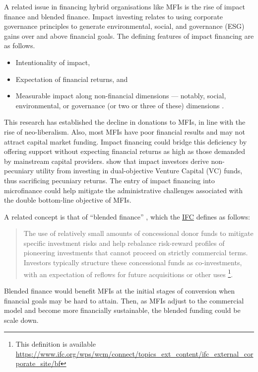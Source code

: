 \documentclass[a4paper, nobind]{templates/ociamthesis}
\begin{document}
A related issue in financing hybrid organisations like MFIs is the rise of impact finance and blended finance. Impact investing relates to using corporate governance principles to generate environmental, social, and governance (ESG) gains over and above financial goals. The defining features of impact financing are as follows.

\begin{itemize}
\item
  Intentionality of impact,
\item
  Expectation of financial returns, and
\item
  Measurable impact along non-financial dimensions --- notably, social, environmental, or governance (or two or three of these) dimensions \autocite{caseau2020impact}.
\end{itemize}

This research has established the decline in donations to MFIs, in line with the rise of neo-liberalism. Also, most MFIs have poor financial results and may not attract capital market funding. Impact financing could bridge this deficiency by offering support without expecting financial returns as high as those demanded by mainstream capital providers. \textcite{barber2021impact} show that impact investors derive non-pecuniary utility from investing in dual-objective Venture Capital (VC) funds, thus sacrificing pecuniary returns. The entry of impact financing into microfinance could help mitigate the administrative challenges associated with the double bottom-line objective of MFIs.

A related concept is that of ``blended finance'' \autocite{attridge2019blended}, which the \href{https://www.ifc.org/wps/wcm/connect/topics_ext_content/ifc_external_corporate_site/bf}{IFC} defines as follows:

\begin{quote}
The use of relatively small amounts of concessional donor funds to mitigate specific investment risks and help rebalance risk-reward profiles of pioneering investments that cannot proceed on strictly commercial terms. Investors typically structure these concessional funds as co-investments, with an expectation of reflows for future acquisitions or other uses \footnote{This definition is available \url{https://www.ifc.org/wps/wcm/connect/topics_ext_content/ifc_external_corporate_site/bf}}.
\end{quote}

Blended finance would benefit MFIs at the initial stages of conversion when financial goals may be hard to attain. Then, as MFIs adjust to the commercial model and become more financially sustainable, the blended funding could be scale down.
\end{document}
